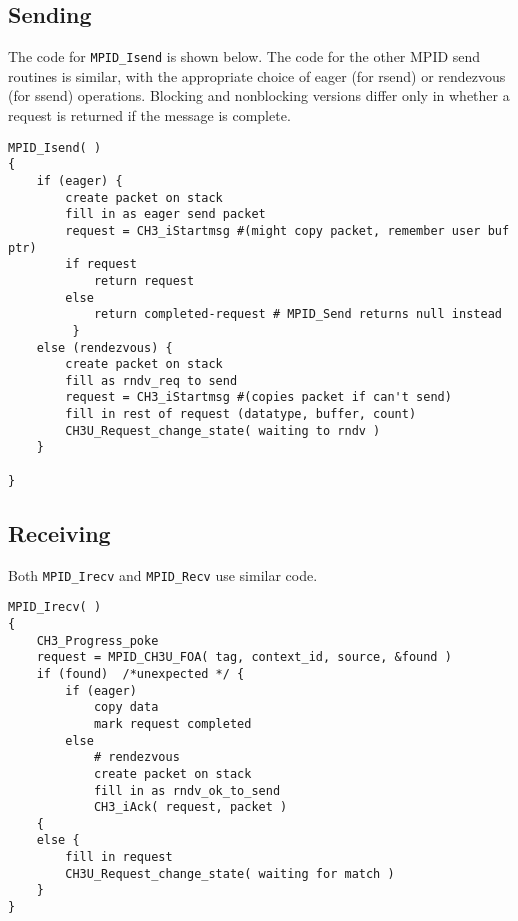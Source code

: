 \documentclass{article}
\def\code#1{\texttt{#1}}
\begin{document}
\subsection{Sending}
The code for \code{MPID_Isend} is shown below.  The code for the other
MPID send routines is similar, with the appropriate choice of eager
(for rsend) or rendezvous (for ssend) operations.  Blocking and
nonblocking versions differ only in whether a request is returned if
the message is complete.

\begin{verbatim}
MPID_Isend( )
{
    if (eager) {
        create packet on stack
        fill in as eager send packet
        request = CH3_iStartmsg #(might copy packet, remember user buf ptr)
        if request
            return request
        else 
            return completed-request # MPID_Send returns null instead
         }
    else (rendezvous) {
        create packet on stack
        fill as rndv_req to send
        request = CH3_iStartmsg #(copies packet if can't send)
        fill in rest of request (datatype, buffer, count)
        CH3U_Request_change_state( waiting to rndv )
    } 

}
\end{verbatim}

\subsection{Receiving}
Both \code{MPID_Irecv} and \code{MPID_Recv} use similar code.

\begin{verbatim}
MPID_Irecv( )
{
    CH3_Progress_poke
    request = MPID_CH3U_FOA( tag, context_id, source, &found )
    if (found)  /*unexpected */ {
        if (eager)
            copy data
            mark request completed
        else
            # rendezvous
            create packet on stack
            fill in as rndv_ok_to_send
            CH3_iAck( request, packet )
    {
    else {
        fill in request
        CH3U_Request_change_state( waiting for match )
    }
}
\end{verbatim}
\end{document}
